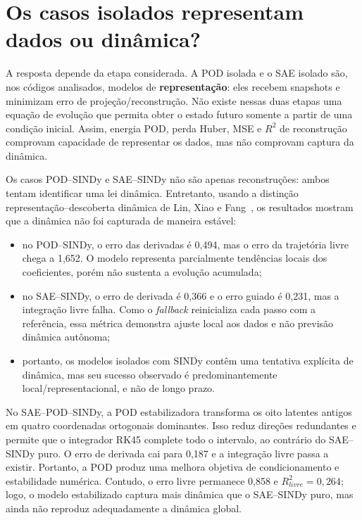 \documentclass[12pt,a4paper]{article}
\begin{document}
\section{Os casos isolados representam dados ou dinâmica?}
A resposta depende da etapa considerada. A POD isolada e o SAE isolado são, nos códigos analisados, modelos de \textbf{representação}: eles recebem snapshots e minimizam erro de projeção/reconstrução. Não existe nessas duas etapas uma equação de evolução que permita obter o estado futuro somente a partir de uma condição inicial. Assim, energia POD, perda Huber, MSE e $R^2$ de reconstrução comprovam capacidade de representar os dados, mas não comprovam captura da dinâmica.

Os casos POD--SINDy e SAE--SINDy não são apenas reconstruções: ambos tentam identificar uma lei dinâmica. Entretanto, usando a distinção representação--descoberta dinâmica de Lin, Xiao e Fang~\cite{lin2024}, os resultados mostram que a dinâmica não foi capturada de maneira estável:
\begin{itemize}
  \item no POD--SINDy, o erro das derivadas é 0,494, mas o erro da trajetória livre chega a 1,652. O modelo representa parcialmente tendências locais dos coeficientes, porém não sustenta a evolução acumulada;
  \item no SAE--SINDy, o erro de derivada é 0,366 e o erro guiado é 0,231, mas a integração livre falha. Como o \emph{fallback} reinicializa cada passo com a referência, essa métrica demonstra ajuste local aos dados e não previsão dinâmica autônoma;
  \item portanto, os modelos isolados com SINDy contêm uma tentativa explícita de dinâmica, mas seu sucesso observado é predominantemente local/representacional, e não de longo prazo.
\end{itemize}

No SAE--POD--SINDy, a POD estabilizadora transforma os oito latentes antigos em quatro coordenadas ortogonais dominantes. Isso reduz direções redundantes e permite que o integrador RK45 complete todo o intervalo, ao contrário do SAE--SINDy puro. O erro de derivada cai para 0,187 e a integração livre passa a existir. Portanto, a POD produz uma melhora objetiva de condicionamento e estabilidade numérica. Contudo, o erro livre permanece 0,858 e $R^2_{livre}=0,264$; logo, o modelo estabilizado captura mais dinâmica que o SAE--SINDy puro, mas ainda não reproduz adequadamente a dinâmica global.
\end{document}
